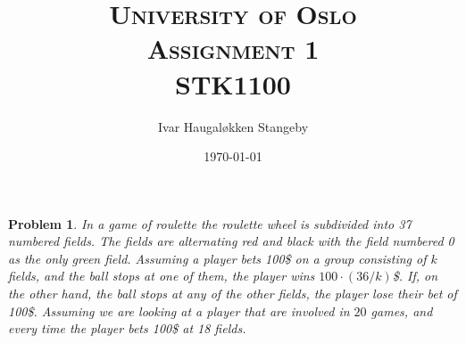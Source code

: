 \documentclass[a4paper]{article}
\title{
  \textsc{University of Oslo} \\
  \textsc{Assignment 1} \\
  \textsc{STK1100}
}
\author{Ivar Haugaløkken Stangeby}
\date{\today}
\newtheorem{prb}{Problem}
\theoremstyle{definition}
\begin{document}
\maketitle

\begin{prb}
  In a game of roulette the roulette wheel is subdivided into 37 numbered
  fields. The fields are alternating red and black with the field numbered 0 as
  the only green field.  Assuming a player bets 100\$ on a group consisting of
  $k$ fields, and the ball stops at one of them, the player wins
  $100\cdot(36/k)$\$. If, on the other hand, the ball stops at any of the other
  fields, the player lose their bet of 100\$.  Assuming we are looking at a
  player that are involved in $20$ games, and every time the player bets 100\$
  at 18 fields.
\end{prb}
\end{document}
